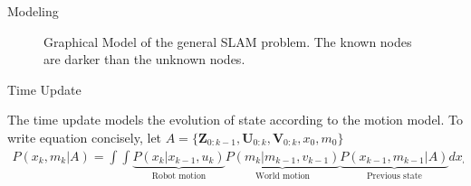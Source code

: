 \documentclass[final]{beamer}
\newlength{\sepwid}
\newlength{\onecolwid}
\begin{document}
\begin{frame}[t]
\begin{columns}[t]
\begin{column}{\onecolwid}
      \begin{block}{Modeling}
        \begin{figure}
          \centering
          \newcommand{\imagewidth}{\onecolwid}
          \scalebox{2.0}{\tiny }
          \caption{Graphical Model of the general SLAM problem. The known nodes are darker than the unknown nodes.
}
        \end{figure}

      \end{block}
      \begin{block}{Time Update}

        The time update models the evolution of state according to the motion model. To write equation concisely, let $A =\{ \mathbf{Z}_{0:k-1},\mathbf{U}_{0:k},\mathbf{V}_{0:k},x_0,m_0 \}$
        \begin{multline}
          P(x_k,m_k|A) = 
          \int \int 
          \underbrace{P(x_k|x_{k-1},u_k)}_{\text{Robot motion}}
          \underbrace{P(m_k|m_{k-1},v_{k-1})}_{\text{World motion}}
          \underbrace{P(x_{k-1},m_{k-1}|A)}_{\text{Previous state}} dx_{k-1}dm_{k-1}
          \label{eq:time_update}
        \end{multline}


      \end{block}
    \end{column}
  \hspace{-\sepwid}



\end{columns}
\end{frame}
\end{document}
